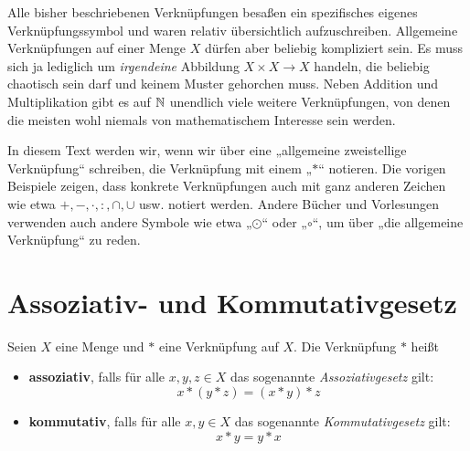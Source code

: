 \begin{bem}
    Alle bisher beschriebenen Verknüpfungen besaßen ein spezifisches eigenes Verknüpfungssymbol und waren relativ übersichtlich aufzuschreiben. Allgemeine Verknüpfungen auf einer Menge $X$ dürfen aber beliebig kompliziert sein. Es muss sich ja lediglich um \emph{irgendeine} Abbildung $X\times X\to X$ handeln, die beliebig chaotisch sein darf und keinem Muster gehorchen muss. Neben Addition und Multiplikation gibt es auf $\mathbb N$ unendlich viele weitere Verknüpfungen, von denen die meisten wohl niemals von mathematischem Interesse sein werden.
\end{bem}


\begin{nota}[Verknüpfungssymbole]
    In diesem Text werden wir, wenn wir über eine „allgemeine zweistellige Verknüpfung“ schreiben, die Verknüpfung mit einem „$*$“ notieren. Die vorigen Beispiele zeigen, dass konkrete Verknüpfungen auch mit ganz anderen Zeichen wie etwa $+,-,\cdot,:,\cap,\cup$ usw. notiert werden. Andere Bücher und Vorlesungen verwenden auch andere Symbole wie etwa „$\odot$“ oder „$\circ$“, um über „die allgemeine Verknüpfung“ zu reden.
\end{nota}





\section{Assoziativ- und Kommutativgesetz}


\begin{de}  
    Seien $X$ eine Menge und $*$ eine Verknüpfung auf $X$. Die Verknüpfung $*$ heißt
    \begin{itemize}
        \item \textbf{assoziativ}, falls für alle $x,y,z\in X$ das sogenannte \emph{Assoziativgesetz} gilt:
            \[ x*(y*z) = (x*y)*z \]
        \item \textbf{kommutativ}, falls für alle $x,y\in X$ das sogenannte \emph{Kommutativgesetz} gilt:
            \[ x*y = y*x \]
    \end{itemize}
\end{de}


